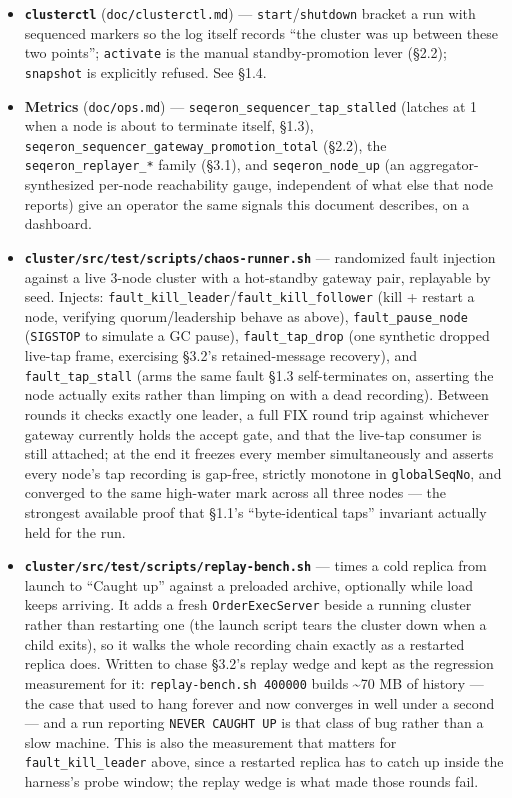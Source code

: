 \documentclass[
  10pt,
]{article}
\providecommand{\tightlist}{%
  \setlength{\itemsep}{0pt}\setlength{\parskip}{0pt}}
\begin{document}
\begin{itemize}
\tightlist
\item
  \textbf{\texttt{clusterctl}} (\texttt{doc/clusterctl.md}) ---
  \texttt{start}/\texttt{shutdown} bracket a run with sequenced markers
  so the log itself records ``the cluster was up between these two
  points''; \texttt{activate} is the manual standby-promotion lever
  (§2.2); \texttt{snapshot} is explicitly refused. See §1.4.
\item
  \textbf{Metrics} (\texttt{doc/ops.md}) ---
  \texttt{seqeron\_sequencer\_tap\_stalled} (latches at 1 when a node
  is about to terminate itself, §1.3),
  \texttt{seqeron\_sequencer\_gateway\_promotion\_total} (§2.2), the
  \texttt{seqeron\_replayer\_*} family (§3.1), and
  \texttt{seqeron\_node\_up} (an aggregator-synthesized per-node
  reachability gauge, independent of what else that node reports) give
  an operator the same signals this document describes, on a dashboard.
\item
  \textbf{\texttt{cluster/src/test/scripts/chaos-runner.sh}} --- randomized
  fault injection against a live 3-node cluster with a hot-standby
  gateway pair, replayable by seed. Injects:
  \texttt{fault\_kill\_leader}/\texttt{fault\_kill\_follower} (kill +
  restart a node, verifying quorum/leadership behave as above),
  \texttt{fault\_pause\_node} (\texttt{SIGSTOP} to simulate a GC pause),
  \texttt{fault\_tap\_drop} (one synthetic dropped live-tap frame,
  exercising §3.2's retained-message recovery), and
  \texttt{fault\_tap\_stall} (arms the same fault §1.3 self-terminates
  on, asserting the node actually exits rather than limping on with a
  dead recording). Between rounds it checks exactly one leader, a full
  FIX round trip against whichever gateway currently holds the accept
  gate, and that the live-tap consumer is still attached; at the end it
  freezes every member simultaneously and asserts every node's tap
  recording is gap-free, strictly monotone in \texttt{globalSeqNo}, and
  converged to the same high-water mark across all three nodes --- the
  strongest available proof that §1.1's ``byte-identical taps''
  invariant actually held for the run.
\item
  \textbf{\texttt{cluster/src/test/scripts/replay-bench.sh}} --- times a cold
  replica from launch to ``Caught up'' against a preloaded archive,
  optionally while load keeps arriving. It adds a fresh
  \texttt{OrderExecServer} beside a running cluster rather than
  restarting one (the launch script tears the cluster down when a child
  exits), so it walks the whole recording chain exactly as a restarted
  replica does. Written to chase §3.2's replay wedge and kept as the
  regression measurement for it: \texttt{replay-bench.sh\ 400000} builds
  \textasciitilde70 MB of history --- the case that used to hang forever
  and now converges in well under a second --- and a run reporting
  \texttt{NEVER\ CAUGHT\ UP} is that class of bug rather than a slow
  machine. This is also the measurement that matters for
  \texttt{fault\_kill\_leader} above, since a restarted replica has to
  catch up inside the harness's probe window; the replay wedge is what
  made those rounds fail.
\end{itemize}
\end{document}
